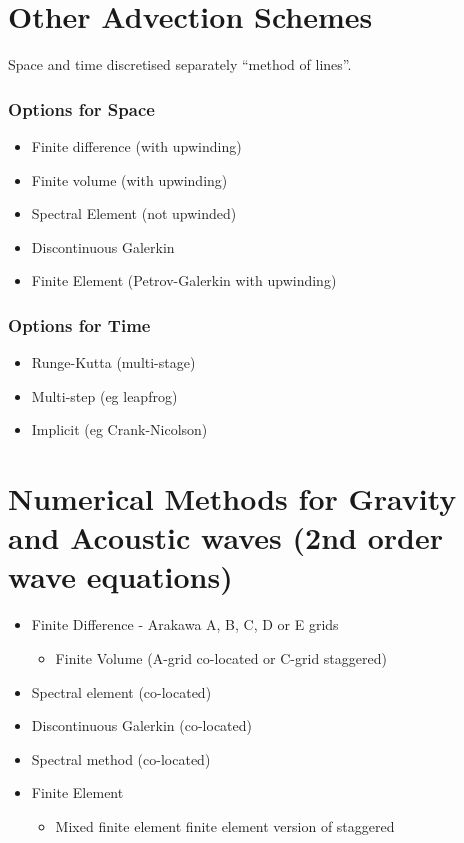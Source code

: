 \clearpage{}

\section*{Other Advection Schemes}

Space and time discretised separately \textendash{} ``method of lines''. 

\begin{minipage}[t]{0.48\columnwidth}%

\subsubsection*{Options for Space}
\begin{itemize}
\item Finite difference (with upwinding)
\item Finite volume (with upwinding)
\item Spectral Element (not upwinded)
\item Discontinuous Galerkin
\item Finite Element (Petrov-Galerkin with upwinding)
\end{itemize}
%
\end{minipage} %
\begin{minipage}[t]{0.48\columnwidth}%

\subsubsection*{Options for Time}
\begin{itemize}
\item Runge-Kutta (multi-stage)
\item Multi-step (eg leapfrog)
\item Implicit (eg Crank-Nicolson)
\end{itemize}
%
\end{minipage}

\clearpage{}

\section*{Numerical Methods for Gravity and Acoustic waves (2nd order wave
equations)}
\begin{itemize}
\item Finite Difference - Arakawa A, B, C, D or E grids \citep{AL77}
\begin{itemize}
\item Finite Volume (A-grid \textendash{} co-located or C-grid \textendash{}
staggered)
\end{itemize}
\item Spectral element (co-located)
\item Discontinuous Galerkin (co-located)
\item Spectral method (co-located)
\item Finite Element
\begin{itemize}
\item Mixed finite element \textendash{} finite element version of staggered
\end{itemize}
\end{itemize}
\clearpage{}

